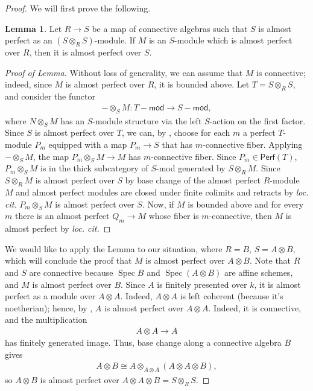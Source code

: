 \documentclass{article}
\numberwithin{equation}{section}
\theoremstyle{quest}
\theoremstyle{definition}
\newtheorem{lem}[thm]{Lemma}
\theoremstyle{remark}
\newcommand{\msf}{\mathsf}
\newcommand{\Mod}{-\msf{mod}}
\DeclareMathOperator{\Spec}{Spec}
\begin{document}
\begin{proof}
	 We will first prove the following.
	 \begin{lem}
	 	Let $R\to S$ be a map of connective algebras such that $S$ is almost perfect as an $(S\otimes _{R}S)$-module. If $M$ is an $S$-module which is almost perfect over $R$, then it is almost perfect over $S$.
	 \end{lem} 
	 \begin{proof}[Proof of Lemma]
	 	 Without loss of generality, we can assume that $M$ is connective; indeed, since $M$ is almost perfect over $R$, it is bounded above. Let $T=S\otimes _RS$, and consider the functor
		 \begin{align*}
		 	-\otimes _SM:T\Mod\to S\Mod,
		 \end{align*} 
		 where $N\otimes _SM$ has an $S$-module structure via the left $S$-action on the first factor. Since $S$ is almost perfect over $T$, we can, by \cite[Proposition 7.4.2.11]{HA}, choose for each $m$ a perfect $T$-module $P_m$ equipped with a map $P_m\to S$ that has $m$-connective fiber. Applying $-\otimes _SM$, the map $P_m\otimes _SM\to M$ has $m$-connective fiber. Since $P_m\in \mathsf{Perf}(T)$, $P_m\otimes_S M$ is in the thick subcategory of $S$-mod generated by $S\otimes _R M$. Since $S\otimes _RM$ is almost perfect over $S$ by base change of the almost perfect $R$-module $M$ and almost perfect modules are closed under finite colimits and retracts by \textit{loc. cit.} $P_m\otimes _SM$ is almost perfect over $S$. Now, if $M$ is bounded above and for every $m$ there is an almost perfect $Q_m\to M$ whose fiber is $m$-connective, then $M$ is almost perfect by \textit{loc. cit.}
	 \end{proof}
	 We would like to apply the Lemma to our situation, where $R=B$, $S=A\otimes B$, which will conclude the proof that $M$ is almost perfect over $A\otimes B$. Note that $R$ and $S$ are connective because $\Spec B$ and $\Spec (A\otimes B)$ are affine schemes, and $M$ is almost perfect over $B$. Since $A$ is finitely presented over $k$, it is almost perfect as a module over $A\otimes A$. Indeed, $A\otimes A$ is left coherent (because it's noetherian); hence, by \cite[Proposition 7.2.4.17]{HA}, $A$ is almost perfect over $A\otimes A$. Indeed, it is connective, and the multiplication
	 \begin{align*}
	 	A\otimes A\to A
	 \end{align*} 
	 has finitely generated image. Thus, base change along a connective algebra $B$ gives
	 \begin{align*}
	 	A\otimes B\cong A\otimes _{A\otimes A}(A\otimes A\otimes B),
	 \end{align*} 
	 so $A\otimes B$ is almost perfect over $A\otimes A\otimes B=S\otimes _RS$.

\end{proof} 
\end{document}
